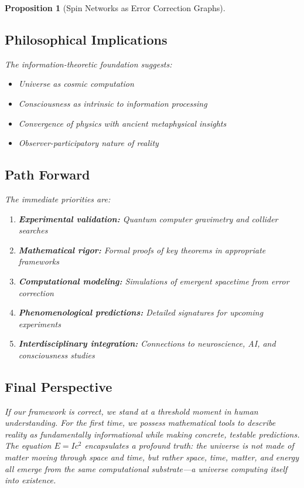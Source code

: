 \documentclass[12pt,a4paper]{article}
\newtheorem{proposition}[theorem]{Proposition}
\theoremstyle{remark}
\begin{document}
\begin{proposition}[Spin Networks as Error Correction Graphs]
\subsection{Philosophical Implications}

The information-theoretic foundation suggests:
\begin{itemize}
\item Universe as cosmic computation
\item Consciousness as intrinsic to information processing
\item Convergence of physics with ancient metaphysical insights
\item Observer-participatory nature of reality
\end{itemize}

\subsection{Path Forward}

The immediate priorities are:

\begin{enumerate}
\item \textbf{Experimental validation:} Quantum computer gravimetry and collider searches
\item \textbf{Mathematical rigor:} Formal proofs of key theorems in appropriate frameworks
\item \textbf{Computational modeling:} Simulations of emergent spacetime from error correction
\item \textbf{Phenomenological predictions:} Detailed signatures for upcoming experiments
\item \textbf{Interdisciplinary integration:} Connections to neuroscience, AI, and consciousness studies
\end{enumerate}

\subsection{Final Perspective}

If our framework is correct, we stand at a threshold moment in human understanding. For the first time, we possess mathematical tools to describe reality as fundamentally informational while making concrete, testable predictions. The equation $E = Ic^2$ encapsulates a profound truth: the universe is not made of matter moving through space and time, but rather space, time, matter, and energy all emerge from the same computational substrate—a universe computing itself into existence.


\end{proposition}
\end{document}
